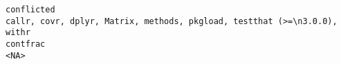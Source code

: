 \documentclass[
  letterpaper,
  DIV=11,
  numbers=noendperiod]{scrreprt}
\begin{document}
\begin{verbatim}
conflicted                                                                                                                                                                                                                                                                                                                                                                                                                                                                                                                                                                                                                                                                                                                                                                                                                                                                                                                                                                                                                                                                                                                                                                                                                          callr, covr, dplyr, Matrix, methods, pkgload, testthat (>=\n3.0.0), withr
contfrac                                                                                                                                                                                                                                                                                                                                                                                                                                                                                                                                                                                                                                                                                                                                                                                                                                                                                                                                                                                                                                                                                                                                                                                                                                                                                                 <NA>

\end{verbatim}
\end{document}
